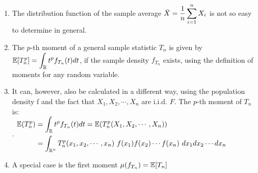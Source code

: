 \begin{enumerate}
    \item The distribution function of the sample average $\bar{X} = \dfrac{1}{n} \displaystyle\sum^n _{i=1} X _i$ is not so easy to determine in general.
    \hfill \cite{statistics/book/Statistics-for-Data-Scientists/Maurits-Kaptein}

    \item The $p$-th moment of a general sample statistic $T_n$ is given by 
    $\mathbb{E}[T ^p _n] = \displaystyle\int _{\mathbb{R}} t^ p f _{T_n} (t) dt$, 
    if the sample density $f _{T_n}$ exists, using the definition of moments for any random variable.
    \hfill \cite{statistics/book/Statistics-for-Data-Scientists/Maurits-Kaptein}

    \item  It can, however, also be calculated in a different way, using the population density f and the fact that $X_1 , X_2, \cdots , X _n$ are i.i.d. $F$.
    The $p$-th moment of $T_n$ is:
    \hfill \cite{statistics/book/Statistics-for-Data-Scientists/Maurits-Kaptein}
    \\
    .\hfill
    $
        \begin{aligned}
            \mbbE (T ^p _n ) 
            &= \dint _\mbbR t ^p f_ {T_n} (t) dt 
            = \mbbE (T ^p _n (X_1, X_2, \cdots , X _n )) \\
            &= \dint _{\mbbR^n} T ^p _n (x_1, x_2, \cdots , x _n )\ f (x_1) f (x_2) \cdots f (x _n ) \ dx_1dx_2 \cdots dx _n
        \end{aligned}
    $
    \hfill \cite{statistics/book/Statistics-for-Data-Scientists/Maurits-Kaptein}

    \item A special case is the first moment $\mu ( f_ {T_n} ) = \mathbb{E}[T_n]$
    \hfill \cite{statistics/book/Statistics-for-Data-Scientists/Maurits-Kaptein}
\end{enumerate}















